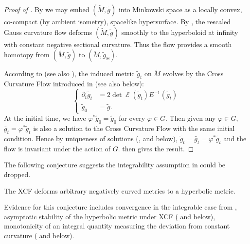 \documentclass{cambridge7a}
\renewcommand{\~}{\tilde}
\renewcommand{\-}{\bar}
\renewcommand{\H}{\mathbb{H}}
\newcommand{\8}{\infty}
\DeclareMathOperator{\opEin}{\mathcal{E}}
\begin{document}
\begin{proof}
[Proof of ]

By  we may embed \((\tilde{M}, \tilde{g})\) into Minkowski space as a locally convex, co-compact (by ambient isometry), spacelike hypersurface. By \cite[Theorem 1.1]{MR3344442}, the rescaled Gauss curvature flow deforms \((\tilde{M}, \tilde{g})\) smoothly to the hyperboloid at infinity with constant negative sectional curvature. Thus the flow provides a smooth homotopy from \((\tilde{M}, \tilde{g})\) to \((\tilde{M}, \tilde{g}_{\H})\).

According to \cite[Section 12]{MR3344442} (see also ), the induced metric \(\tilde{g}_t\) on \(\tilde{M}\) evolves by the Cross Curvature Flow introduced in \cite{MR2055396} (see also  below):
\[
\begin{cases}
\partial_t \tilde{g}_t &= 2\det \opEin(\tilde{g}_{t}) E^{-1}(\tilde{g}_{t}) \\
\tilde{g}_0 &= \tilde{g}.
\end{cases}
\]
At the initial time, we have \(\varphi^{\ast} \tilde{g}_0 = \tilde{g}_0\) for every \(\varphi \in G\). Then given any \(\varphi \in G\), \(\bar{g}_t = \varphi^{\ast} \tilde{g}_t\) is also a solution to the Cross Curvature Flow with the same initial condition. Hence by uniqueness of solutions (\cite{MR2055396,MR2207496},  and  below), \(\tilde{g}_t = \bar{g}_t = \varphi^{\ast} \tilde{g}_t\) and the flow is invariant under the action of \(G\).  then gives the result.
\end{proof}

The following conjecture suggests the integrability assumption in  could be dropped.

\begin{conj}[\cite{MR2055396}]
\label{conj:chow_hamilton}

The XCF deforms arbitrary negatively curved metrics to a hyperbolic metric.
\end{conj}

Evidence for this conjecture includes convergence in the integrable case from , asymptotic stability of the hyperbolic metric under XCF (\cite{MR2448593} and  below), monotonicity of an integral quantity measuring the deviation from constant curvature (\cite{MR2055396} and  below).
\end{document}
